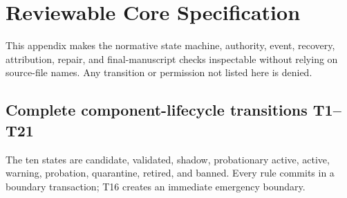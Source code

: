 \section{Reviewable Core Specification}\label{sec:appendix:specification}

This appendix makes the normative state machine, authority, event, recovery,
attribution, repair, and final-manuscript checks inspectable without relying
on source-file names. Any transition or permission not listed here is denied.

\subsection{Complete component-lifecycle transitions T1--T21}\label{sec:appendix:transitions}

The ten states are candidate, validated, shadow, probationary active, active,
warning, probation, quarantine, retired, and banned. Every rule commits in a
boundary transaction; T16 creates an immediate emergency boundary.

